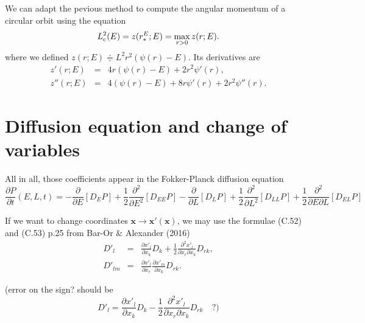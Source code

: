 \documentclass[11pt]{article}
\newcommand{\dE}{D_{E}}
\newcommand{\dL}{D_{L}}
\newcommand{\dEE}{D_{EE}}
\newcommand{\dLL}{D_{LL}}
\newcommand{\dEL}{D_{EL}}
\newcommand{\bx}{\boldsymbol{x}}
\newcommand{\xp}{x'}
\newcommand{\bxp}{\boldsymbol{\xp}}
\begin{document}
We can adapt the pevious method to compute the angular momentum of a circular orbit using the equation
\begin{equation}
L_{{\rm c}}^{2}(E)=z(r_{*}^{E};E)=\max_{r>0}z(r;E).
\label{eq:angular_circular}
\end{equation}
where we defined $z(r;E)\doteqdot L^{2}r^{2}(\psi(r)-E)$. Its derivatives are
\begin{equation}
\begin{array}{ccl}
  z'(r;E) & =& \displaystyle{4r(\psi(r)-E)+2r^{2}\psi'(r)} ,\\
  
  z''(r;E) & =&\displaystyle{4(\psi(r)-E)+8r\psi'(r)+2r^{2}\psi''(r)} .
\end{array}
\label{eq:z_derivatives}
\end{equation}

\section{Diffusion equation and change of variables}
\label{sec:diffEq_changeVar}

All in all, those coefficients appear in the Fokker-Planck diffusion
equation
\begin{equation}
\frac{\partial P}{\partial t}(E,L,t)=-\frac{\partial}{\partial E}\left[\dE P\right]+\frac{1}{2}\frac{\partial^{2}}{\partial E^{2}}\left[\dEE P\right]-\frac{\partial}{\partial L}\left[\dL P\right]+\frac{1}{2}\frac{\partial^{2}}{\partial L^{2}}\left[\dLL P\right]+\frac{1}{2}\frac{\partial^{2}}{\partial E\partial L}\left[\dEL P\right]
\label{eq:FP:equation}
\end{equation}

If we want to change coordinates $\bx\rightarrow\bxp(\bx)$,
we may use the formulae (C.52) and (C.53) p.25 from Bar-Or \& Alexander
(2016)
\begin{equation}
\begin{array}{ccl}
  D'_{l} & =& \displaystyle{\frac{\partial \xp_{l}}{\partial x_{k}}D_{k}+\frac{1}{2}\frac{\partial^{2}\xp_{l}}{\partial x_{r}\partial x_{k}}D_{rk}} ,\\
  
 D'_{lm} & =&\displaystyle{\frac{\partial \xp_{l}}{\partial x_{r}}\frac{\partial \xp_{m}}{\partial x_{k}}D_{rk}} .
\end{array}
\label{eq:change_var_DiffCoeffs}
\end{equation}


(error on the sign? should be
\[
D'_{l}=\frac{\partial \xp_{l}}{\partial x_{k}}D_{k}-\frac{1}{2}\frac{\partial^{2}\xp_{l}}{\partial x_{r}\partial x_{k}}D_{rk}\quad?)
\]
\end{document}
